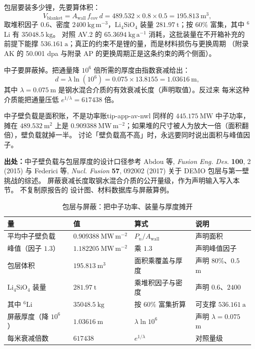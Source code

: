 包层要装多少锂，先要算体积：
\begin{equation}
V_\mathrm{blanket}=A_\mathrm{wall}\,f_\mathrm{cov}\,d
=489.532\times0.8\times0.5=195.813\ \mathrm{m^{3}},
\label{eq:app-av-blanket}
\end{equation}
取堆积因子 $0.6$、密度 $2400\ \mathrm{kg\,m^{-3}}$，$\mathrm{Li_4SiO_4}$ 装量
$281.97\ \mathrm{t}$；按 $60\%$ 富集，其中 $^{6}$Li 有 $35048.5\ \mathrm{kg}$。
对照 AV.2 的 $65.3694\ \mathrm{kg\,a^{-1}}$ 消耗，这批装量在不开箱补充的前提下能撑
$536.161\ \mathrm{a}$；真正的约束不是锂的量，而是材料损伤与更换周期
（附录 AK 的 50.001 dpa 与附录 AP 的更换周期正是这条约束的两个侧面）。

中子要屏蔽掉。把通量降 $10^{6}$ 倍所需的厚度由指数衰减给出：
\begin{equation}
d=\lambda\ln(10^{6})=0.075\times13.8155=1.03616\ \mathrm{m},
\label{eq:app-av-shield}
\end{equation}
其中 $\lambda=0.075\ \mathrm{m}$ 是钢水混合介质的有效衰减长度（声明取值）。反过来
每米这种介质能把通量压低 $e^{1/\lambda}=617438$ 倍。

\begin{tip}{中子壁负载是面积账，不是功率账}{tip-app-av-nwl}
同样的 $445.175\ \mathrm{MW}$ 中子功率，摊在 $489.532\ \mathrm{m^{2}}$ 上是
$0.909388\ \mathrm{MW\,m^{-2}}$；如果堆的尺寸被人为放大一倍（面积翻倍），壁负载就掉一半。
讨论「壁负载高不高」时，永远要同时说出面积与峰值因子。
\end{tip}

{\footnotesize
\textbf{出处：}中子壁负载与包层厚度的设计口径参考 Abdou 等,
\emph{Fusion Eng. Des.} \textbf{100}, 2 (2015) 与 Federici 等,
\emph{Nucl. Fusion} \textbf{57}, 092002 (2017) 关于 DEMO 包层与第一壁挑战的综述。
屏蔽衰减长度取钢水混合介质的公开量级，作为声明输入写入本节。
不复制原报告的
设计图、材料数据库与屏蔽算例。
}

\begin{table}[htbp]
\centering
\small
\caption{包层与屏蔽：把中子功率、装量与厚度摊开}
\label{tab:app-av-blanket}
\begin{tabular}{p{3.4cm}p{3.4cm}p{3.6cm}p{3.6cm}}
\hline
量 & 值 & 算式 & 说明 \\
\hline
平均中子壁负载 & $0.909388\ \mathrm{MW\,m^{-2}}$ & $P_n/A_\mathrm{wall}$ & 声明面积 \\
峰值（因子 $1.3$） & $1.182205\ \mathrm{MW\,m^{-2}}$ & 乘 $1.3$ & 声明峰值因子 \\
包层体积 & $195.813\ \mathrm{m^{3}}$ & 面积乘覆盖与厚度 & 声明 $80\%$、$0.5$ m \\
$\mathrm{Li_4SiO_4}$ 装量 & $281.97\ \mathrm{t}$ & 乘堆积因子与密度 & 声明 $0.6$、$2400$ \\
其中 $^6$Li & $35048.5\ \mathrm{kg}$ & 按 $60\%$ 富集折算 & 可支撑 $536.161\ \mathrm{a}$ \\
屏蔽厚度（降 $10^{6}$） & $1.03616\ \mathrm{m}$ & $\lambda\ln10^{6}$ & 声明 $\lambda=0.075$ m \\
每米衰减倍数 & $617438$ & $e^{1/\lambda}$ & 对照量级 \\
\hline
\end{tabular}
\end{table}

